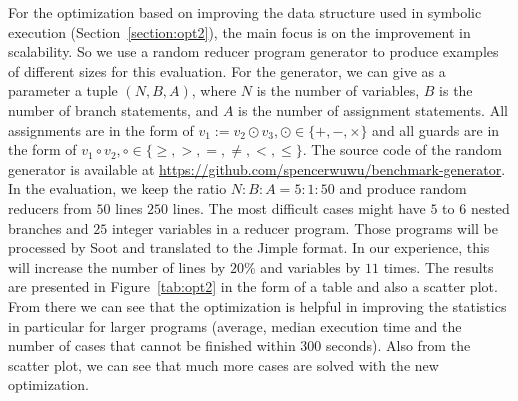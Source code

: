 \documentclass{llncs}
\begin{document}
For the optimization based on improving the data structure used in symbolic execution (Section~\ref{section:opt2}), the main focus is on the improvement in scalability. So we use a random reducer program generator to produce examples of different sizes for this evaluation.
For the generator, we can give as a parameter a tuple $(N,B,A)$, where $N$ is the number of variables, $B$ is the number of branch statements, and $A$ is the number of assignment statements. All assignments are in the form of $v_1 := v_2\odot v_3,\odot\in\{+,-,\times\}$ and all guards are in the form of $v_1 \circ v_2, \circ\in\{\geq, >,=, \neq, <,\leq \}$.
The source code of the random generator is available at \url{https://github.com/spencerwuwu/benchmark-generator}.
In the evaluation, we keep the ratio $N:B:A = 5:1:50$ and produce random reducers from $50$ lines $250$ lines. The most difficult cases might have $5$ to $6$ nested branches and $25$ integer variables in a reducer program. Those programs will be processed by Soot and translated to the Jimple format. In our experience, this will increase the number of lines by $20\%$ and variables by $11$ times. The results are presented in Figure~\ref{tab:opt2} in the form of a table and also a scatter plot. From there we can see that the optimization is helpful in improving the statistics in particular for larger programs (average, median execution time and the number of cases that cannot be finished within 300 seconds). Also from the scatter plot, we can see that much more cases are solved with the new optimization.
\end{document}
